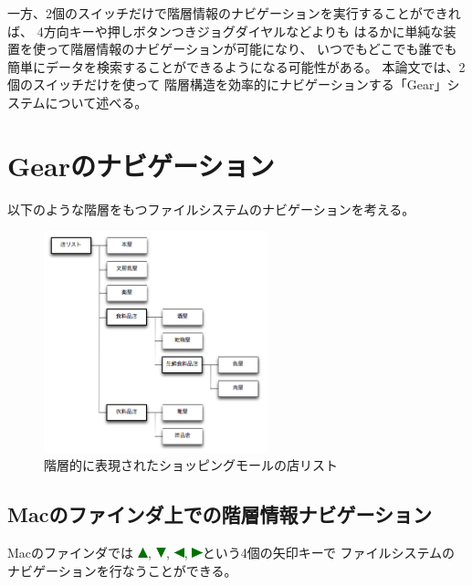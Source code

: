 \documentclass[twoside]{wiss}
\def\GEAR{\textsf{Gear}}
\def\uptriangle{\includegraphics[width=3mm,bb=0 0 36 36]{figures/uptriangle.pdf}}
\def\downtriangle{\includegraphics[width=3mm,bb=0 0 36 36]{figures/downtriangle.pdf}}
\def\righttriangle{\includegraphics[width=3mm,bb=0 0 36 36]{figures/righttriangle.pdf}}
\def\lefttriangle{\includegraphics[width=3mm,bb=0 0 36 36]{figures/lefttriangle.pdf}}
\begin{document}
一方、2個のスイッチだけで階層情報のナビゲーションを実行することができれば、
4方向キーや押しボタンつきジョグダイヤルなどよりも
はるかに単純な装置を使って階層情報のナビゲーションが可能になり、
いつでもどこでも誰でも簡単にデータを検索することができるようになる可能性がある。
%
本論文では、2個のスイッチだけを使って
階層構造を効率的にナビゲーションする「{\GEAR}」システムについて述べる。



\section{{\GEAR}のナビゲーション}
\label{description}

% 

以下のような階層をもつファイルシステムのナビゲーションを考える。

\begin{figure}[H]
\centerline{\includegraphics[width=65mm,bb=0 0 509 502]{figures/ae9216b00626f9c4eea44cc380f25886.png}}
\caption{階層的に表現されたショッピングモールの店リスト}
\label{screenshot1}
\end{figure}

\subsection*{Macのファインダ上での階層情報ナビゲーション}

Macのファインダでは
{\uptriangle},
{\downtriangle},
{\lefttriangle},
{\righttriangle}という4個の矢印キーで
ファイルシステムのナビゲーションを行なうことができる。
\end{document}
